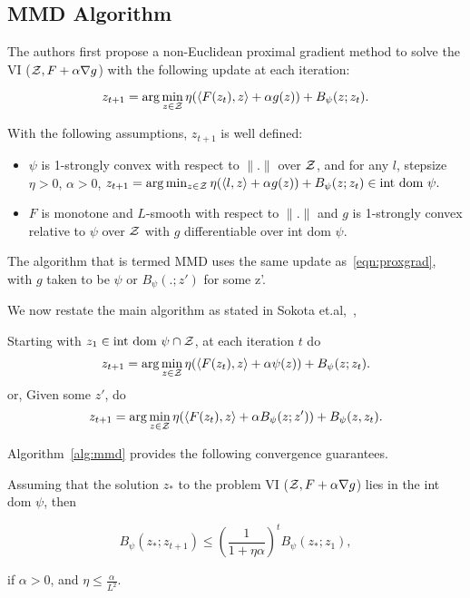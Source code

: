 \subsection{MMD Algorithm}

The authors first propose a non-Euclidean proximal gradient method to solve the VI ($\mathcal{Z}, F +
	\alpha \nabla g$) with the following update at each iteration:

\begin{equation}
	\label{eqn:proxgrad} z_{t+1} = \arg \min_{z \in \mathcal{Z}} \eta (\langle F(z_t), z\rangle + \alpha
	g(z)) + B_{\psi} (z; z_t).
\end{equation}

With the following assumptions, $z_{t+1}$ is well defined:

\begin{itemize}
	\item $\psi$ is 1-strongly convex with respect to $\|.
		      \|$ over $\mathcal{Z}$, and for
	      any $l$, stepsize $\eta > 0$, $\alpha > 0$,
	      $z_{t+1} = \arg \min_{z \in \mathcal{Z}} \eta (\langle l, z \rangle + \alpha g(z)) + B_{\psi}(z;z_t) \in \text{int dom } \psi.$

	\item $F$ is monotone and $L$-smooth with respect to $\|.\|$ and $g$ is 1-strongly convex
	      relative to $\psi$ over $\mathcal{Z}$ with $g$ differentiable over int dom $\psi$.
\end{itemize}

The algorithm that is termed MMD uses the same update as~\ref{eqn:proxgrad}, with $g$ taken to be
$\psi$ or $B_{\psi}(.
	;z')$ for some z'.

We now restate the main algorithm as stated in Sokota et.al,~\cite{sokotaUnified2023},

\begin{alprocedure}[H]  \label{alg:mmd} Starting with $z_1 \in \text{int dom } \psi \cap \mathcal{Z}$,
	at each iteration $t$ do $$ z_{t+1} = \arg \min_{z \in \mathcal{Z}} \eta (\langle F(z_t), z\rangle +
		\alpha \psi(z)) + B_{\psi} (z; z_t).
	$$
	or,
	Given some $z'$, do $$ z_{t+1} = \arg \min_{z \in \mathcal{Z}} \eta (\langle F(z_t), z\rangle + \alpha
		B_{\psi}(z; z')) + B_{\psi} (z, z_t).
	$$
\end{alprocedure}

\hfill \break
Algorithm~\ref{alg:mmd} provides the following convergence guarantees.

\begin{theorem}
	\label{thm:mmdconv}
	\cite[Theorem 3.4]{sokotaUnified2023}
	Assuming that the solution $z_{\ast}$ to the problem VI ($\mathcal{Z}, F + \alpha \nabla g$) lies in the
	int dom $\psi$, then

	\[ B_{\psi} (z_{\ast}; z_{t + 1}) \leq {\left(\frac{1}{1 +
				\eta \alpha}\right)}^t B_{\psi} (z_{\ast}; z_1), \]

	if $\alpha > 0$, and $\eta
		\leq \frac{\alpha}{L^2}$.
\end{theorem}

